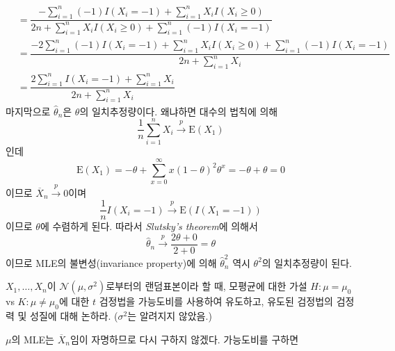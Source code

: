 \documentclass[answers]{exam}
\begin{document}
\begin{questions}
\begin{solution}
\begin{enumerate}[(a)]
\begin{align}
          &= \dfrac{-\displaystyle\sum_{i=1}^{n}\left(-1\right)I\left(X_{i}=-1\right)+\sum_{i=1}^{n}X_{i}I\left(X_{i}\geq 0\right)}{2n+\displaystyle\sum_{i=1}^{n}X_{i}I\left(X_{i}\geq 0\right)+\sum_{i=1}^{n}\left(-1\right)I\left(X_{i}=-1\right)}\\
          &= \dfrac{-2\displaystyle\sum_{i=1}^{n}\left(-1\right)I\left(X_{i}=-1\right)+\sum_{i=1}^{n}X_{i}I\left(X_{i}\geq 0\right)+\sum_{i=1}^{n}\left(-1\right)I\left(X_{i}=-1\right)}{2n+\displaystyle\sum_{i=1}^{n}X_{i}}\\
          &= \dfrac{2\displaystyle\sum_{i=1}^{n}I\left(X_{i}=-1\right)+\sum_{i=1}^{n}X_{i}}{2n+\displaystyle\sum_{i=1}^{n}X_{i}}
        \end{align}
        마지막으로 $\widehat{\theta}_{n}$은 $\theta$의 일치추정량이다. 왜냐하면 대수의 법칙에 의해
        \begin{equation}
          \dfrac{1}{n}\sum_{i=1}^{n}X_{i}\xrightarrow{p} \mathrm{E}\left(X_{1}\right)
        \end{equation}
        인데
        \begin{equation}
          \mathrm{E}\left(X_{1}\right) = -\theta + \sum_{x=0}^{\infty}x\left(1-\theta\right)^{2}\theta^{x} = -\theta+\theta=0
        \end{equation}
        이므로 $\overline{X}_{n}\xrightarrow{p} 0$이며
        \begin{equation}
          \dfrac{1}{n}I\left(X_{i}=-1\right) \xrightarrow{p} \mathrm{E}\left(I\left(X_{1}=-1\right)\right)
        \end{equation}
        이므로 $\theta$에 수렴하게 된다. 따라서 \emph{Slutsky's theorem}에 의해서
        \begin{equation}
          \widehat{\theta}_{n} \xrightarrow{p} \dfrac{2\theta + 0}{2 + 0} = \theta
        \end{equation}
        이므로 MLE의 불변성(invariance property)에 의해 $\widehat{\theta}_{n}^{2}$ 역시 $\theta^{2}$의 일치추정량이 된다.
      \end{enumerate}
    \end{solution}
    \question
    $X_{1},\ldots,X_{n}$이 $\mathcal{N}\left(\mu,\sigma^{2}\right)$로부터의 랜덤표본이라 할 때, 모평균에 대한 가설 $H:\mu=\mu_{0}$ vs $K:\mu\neq\mu_{0}$에 대한 $t$ 검정법을 가능도비를 사용하여 유도하고, 유도된 검정법의 검정력 및 성질에 대해 논하라. ($\sigma^{2}$는 알려지지 않았음.)
    \begin{solution}
      $\mu$의 MLE는 $\overline{X}_{n}$임이 자명하므로 다시 구하지 않겠다. 가능도비를 구하면
      \begin{align}

\end{align}
\end{solution}
\end{questions}
\end{document}
